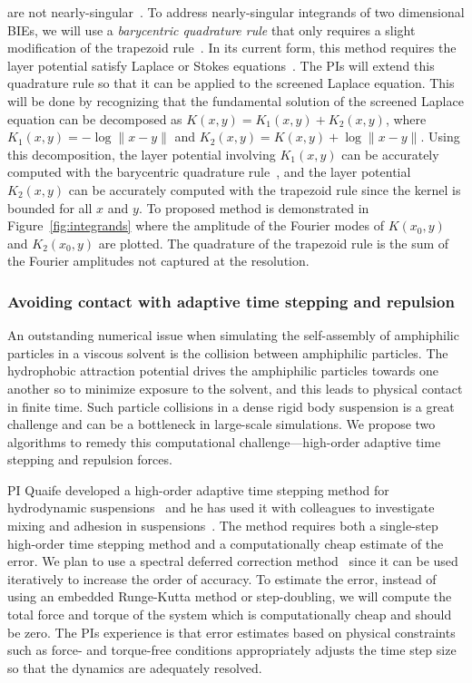 are not nearly-singular~\cite{tre-wei2014}. To address nearly-singular
integrands of two dimensional BIEs, we will use a {\em barycentric
quadrature rule} that only requires a slight modification of the
trapezoid rule~\cite{ioa-pap-per1991}. In its current form, this method
requires the layer potential satisfy Laplace or Stokes
equations~\cite{bar-wu-vee2015, chi-moo-qua2020}. The PIs will extend
this quadrature rule so that it can be applied to the screened Laplace
equation. This will be done by recognizing that the fundamental solution
of the screened Laplace equation can be decomposed as $K(x,y) = K_1(x,y)
+ K_2(x,y)$, where $K_1(x,y) = -\log\|x - y\|$ and $K_2(x,y) = K(x,y) +
\log\|x - y\|$. Using this decomposition, the layer potential involving
$K_1(x,y)$ can be accurately computed with the barycentric quadrature
rule~\cite{ioa-pap-per1991}, and the layer potential $K_2(x,y)$ can be
accurately computed with the trapezoid rule since the kernel is bounded
for all $x$ and $y$. To proposed method is demonstrated in
Figure~\ref{fig:integrands} where the amplitude of the Fourier modes of
$K(x_0,y)$ and $K_2(x_0,y)$ are plotted. The quadrature of the trapezoid
rule is the sum of the Fourier amplitudes not captured at the
resolution.


\subsubsection{Avoiding contact with adaptive time stepping and
repulsion}
\label{subsec:timeStepping}

An outstanding numerical issue when simulating the
self-assembly of amphiphilic particles in a viscous solvent is the
collision between amphiphilic particles. The hydrophobic attraction
potential drives the amphiphilic particles towards one another so to
minimize exposure to the solvent, and this leads to physical contact in
finite time. Such particle collisions in a dense rigid body suspension
is a great challenge and can be a bottleneck in large-scale simulations.
We propose two algorithms to remedy this computational
challenge---high-order adaptive time stepping and repulsion forces.

PI Quaife developed a high-order adaptive time stepping method for
hydrodynamic suspensions~\cite{qua-bir2016} and he has used it with
colleagues to investigate mixing and adhesion in
suspensions~\cite{qua-vee-you2019, kab-qua-bir2017}. The method requires
both a single-step high-order time stepping method and a computationally
cheap estimate of the error. We plan to use a spectral deferred
correction method~\cite{dut-gre-rok2000} since it can be used
iteratively to increase the order of accuracy. To estimate the error,
instead of using an embedded Runge-Kutta method or step-doubling, we
will compute the total force and torque of the system which is
computationally cheap and should be zero. The PIs experience is that
error estimates based on physical constraints such as force- and
torque-free conditions appropriately adjusts the time step size so that
the dynamics are adequately resolved.

